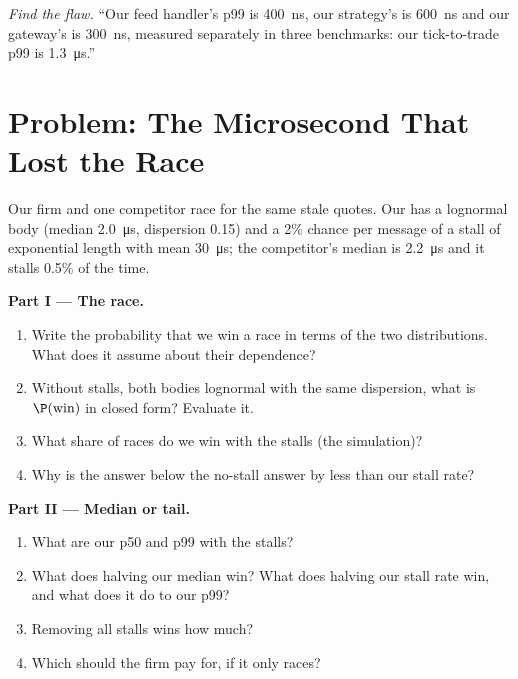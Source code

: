 \begin{exercise}[$\star\star\star$]\label{exo:ll:where-latency-comes-from:8}
\emph{Find the flaw.} ``Our feed handler's p99 is \qty{400}{\nano\second}, our strategy's is \qty{600}{\nano\second}
and our gateway's is \qty{300}{\nano\second}, measured separately in three benchmarks: our tick-to-trade p99 is
\qty{1.3}{\micro\second}.''
\end{exercise}

\section{Problem: The Microsecond That Lost the Race}

\begin{problem}\label{pb:ll:where-latency-comes-from:1}
Our firm and one competitor race for the same stale quotes. Our  has a lognormal body (median
\qty{2.0}{\micro\second}, dispersion 0.15) and a 2\% chance per message of a stall of exponential length with mean
\qty{30}{\micro\second}; the competitor's median is \qty{2.2}{\micro\second} and it stalls 0.5\% of the time.

\medskip\noindent\textbf{Part I --- The race.}
\begin{enumerate}
\item Write the probability that we win a race in terms of the two  distributions. What does it assume about
their dependence?
\item Without stalls, both bodies lognormal with the same dispersion, what is $\P(\text{win})$ in closed form?
Evaluate it.
\item What share of races do we win with the stalls (the simulation)?
\item Why is the answer below the no-stall answer by less than our stall rate?
\end{enumerate}

\medskip\noindent\textbf{Part II --- Median or tail.}
\begin{enumerate}[resume]
\item What are our p50 and p99 with the stalls?
\item What does halving our median win? What does halving our stall rate win, and what does it do to our p99?
\item Removing all stalls wins how much?
\item Which should the firm pay for, if it only races?
\end{enumerate}


\end{problem}
